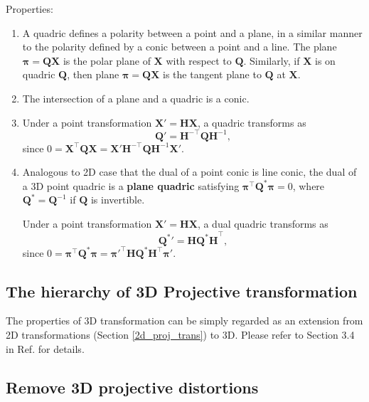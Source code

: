 \documentclass[12pt]{article}
\numberwithin{equation}{section}
\begin{document}
Properties:
\begin{enumerate}
\item
A quadric defines a polarity between a point and a plane, in a similar manner to the polarity defined by a conic between a point and a line. The plane $\bm{\pi} = \mathbf{QX}$ is the polar plane of $\mathbf{X}$ with respect to $\mathbf{Q}$. Similarly, if  $\mathbf{X}$ is on quadric $\mathbf{Q}$, then plane $\bm{\pi} = \mathbf{QX}$ is the tangent plane to $\mathbf{Q}$ at $\mathbf{X}$.  
\item
The intersection of a plane and a quadric is a conic.
\item
Under a point transformation $\mathbf{X' = HX}$, a  quadric transforms as
\begin{equation}
\mathbf{Q}' = \mathbf{H}^{-\top}\mathbf{QH}^{-1},
\label{eq:quadric_transform}
\end{equation}
since $0 = \mathbf{X^\top Q X} = \mathbf{X}'\mathbf{H}^{-\top} \mathbf{Q} \mathbf{H}^{-1}\mathbf{X}'$.
\item
Analogous to 2D case that the dual of a point conic is line conic, the dual of a 3D point quadric is a \textbf{plane quadric} satisfying $\bm{\pi}^\top \mathbf{Q}^* \bm{\pi} = 0$, where $\mathbf{Q}^* = \mathbf{Q}^{-1}$ if $\mathbf{Q}$ is invertible.

Under a point transformation $\mathbf{X' = HX}$, a dual quadric transforms as
\begin{equation}
{\mathbf{Q}^*}' = \mathbf{H}\mathbf{Q^* H}^{\top},
\label{eq:dual_quadric_transform}
\end{equation}
since $0 = \bm{\pi}^\top \mathbf{Q}^* \bm{\pi} = \bm{\pi}'^\top \mathbf{H}  \mathbf{Q}^* \mathbf{H}^\top \bm{\pi}'$.
\end{enumerate}




\subsection{The hierarchy of 3D Projective transformation}

The properties of 3D transformation can be simply regarded as an extension from 2D transformations (Section \ref{2d_proj_trans}) to 3D. Please refer to Section 3.4 in Ref. \cite{hartley2003multiple} for details.

\subsection{Remove 3D projective distortions}
\end{document}

